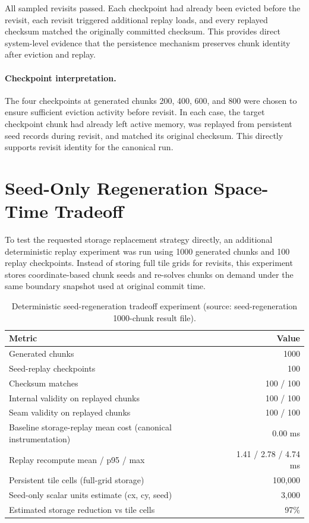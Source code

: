 \documentclass[12pt,a4paper]{report}
\begin{document}
All sampled revisits passed. Each checkpoint had already been evicted before the revisit, each revisit triggered additional replay loads, and every replayed checksum matched the originally committed checksum. This provides direct system-level evidence that the persistence mechanism preserves chunk identity after eviction and replay.

\paragraph{Checkpoint interpretation.} The four checkpoints at generated chunks 200, 400, 600, and 800 were chosen to ensure sufficient eviction activity before revisit. In each case, the target checkpoint chunk had already left active memory, was replayed from persistent seed records during revisit, and matched its original checksum. This directly supports revisit identity for the canonical run.

\section{Seed-Only Regeneration Space-Time Tradeoff}
To test the requested storage replacement strategy directly, an additional deterministic replay experiment was run using 1000 generated chunks and 100 replay checkpoints. Instead of storing full tile grids for revisits, this experiment stores coordinate-based chunk seeds and re-solves chunks on demand under the same boundary snapshot used at original commit time.

\begin{table}[H]
\centering
\small
\begin{tabular}{lr}
\toprule
Metric & Value \\
\midrule
Generated chunks & 1000 \\
Seed-replay checkpoints & 100 \\
Checksum matches & 100 / 100 \\
Internal validity on replayed chunks & 100 / 100 \\
Seam validity on replayed chunks & 100 / 100 \\
Baseline storage-replay mean cost (canonical instrumentation) & 0.00 ms \\
Replay recompute mean / p95 / max & 1.41 / 2.78 / 4.74 ms \\
Persistent tile cells (full-grid storage) & 100,000 \\
Seed-only scalar units estimate (cx, cy, seed) & 3,000 \\
Estimated storage reduction vs tile cells & 97\% \\
\bottomrule
\end{tabular}
\caption{Deterministic seed-regeneration tradeoff experiment (source: seed-regeneration 1000-chunk result file).}
\label{tab:seed-regen-tradeoff}
\end{table}
\end{document}
